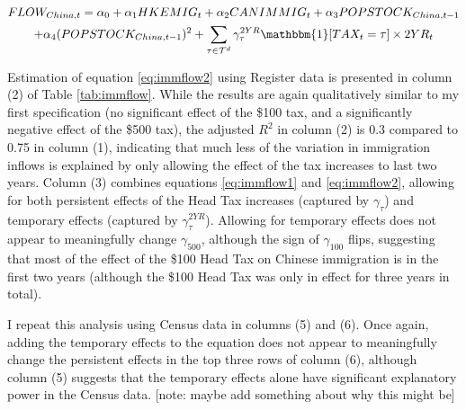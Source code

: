 \begin{multline}
    \label{eq:immflow2}
    FLOW_{China,t} = \alpha_0 + \alpha_1 HKEMIG_t + \alpha_2 CANIMMIG_t + \alpha_3 POPSTOCK_{China, t-1} \\ + \alpha_4 (POPSTOCK_{China, t-1})^2 + \sum_{\tau \in \mathcal{T}^d} \gamma^{2YR}_\tau \mathbbm{1}[TAX_t = \tau]\times 2YR_t
\end{multline}

Estimation of equation \ref{eq:immflow2} using Register data is presented in column (2) of Table \ref{tab:immflow}. While the results are again qualitatively similar to my first specification (no significant effect of the \$100 tax, and a significantly negative effect of the \$500 tax), the adjusted $R^2$ in column (2) is 0.3 compared to 0.75 in column (1), indicating that much less of the variation in immigration inflows is explained by only allowing the effect of the tax increases to last two years. Column (3) combines equations \ref{eq:immflow1} and \ref{eq:immflow2}, allowing for both persistent effects of the Head Tax increases (captured by $\gamma_{\tau}$) and temporary effects (captured by $\gamma_{\tau}^{2YR}$). 
Allowing for temporary effects does not appear to meaningfully change $\gamma_{500}$, although the sign of $\gamma_{100}$ flips, suggesting that most of the effect of the \$100 Head Tax on Chinese immigration is in the first two years (although the \$100 Head Tax was only in effect for three years in total).

I repeat this analysis using Census data in columns (5) and (6). Once again, adding the temporary effects to the equation does not appear to meaningfully change the persistent effects in the top three rows of column (6), although column (5) suggests that the temporary effects alone have significant explanatory power in the Census data. [note: maybe add something about why this might be]

